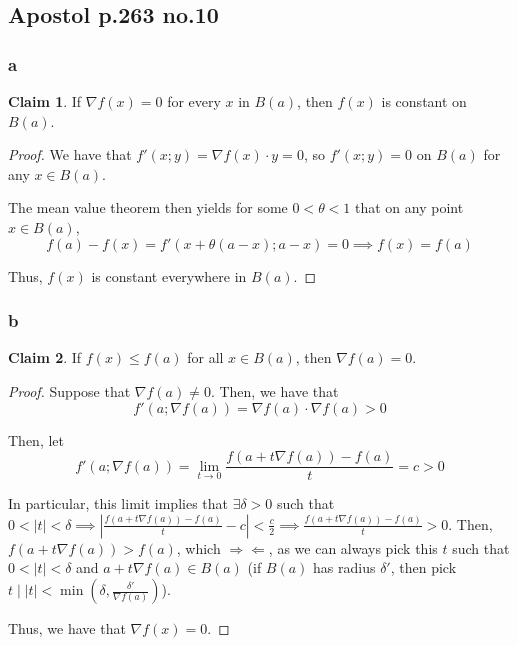 \documentclass[12pt,letterpaper]{article}
\theoremstyle{definition}
\newtheorem*{claim}{Claim}
\newcommand{\contra}{\Rightarrow\!\Leftarrow}
\begin{document}
\subsection*{Apostol p.263 no.10}

\subsubsection*{a}

\begin{claim}
  If $\nabla f(x) = 0$ for every $x$ in $B(a)$, then $f(x)$ is constant on $B(a)$.
\end{claim}

\begin{proof}
  We have that $f'(x;y) = \nabla f(x) \cdot y = 0$, so $f'(x;y) = 0$ on $B(a)$
  for any $x \in B(a)$.
  
  The mean value theorem then yields for some $0 < \theta < 1$ that on any point
  $x \in B(a)$,
  \[
    f(a) - f(x) = f'(x+\theta(a-x);a-x) = 0 \implies f(x) = f(a)
  \]

  Thus, $f(x)$ is constant everywhere in $B(a)$.
\end{proof}

\subsubsection*{b}

\begin{claim}
  If $f(x) \leq f(a)$ for all $x \in B(a)$, then $\nabla f(a) = 0$.
\end{claim}

\begin{proof}
  Suppose that $\nabla f(a) \neq 0$. Then, we have that
  \[
    f'(a; \nabla f(a)) = \nabla f(a) \cdot \nabla f(a) > 0
  \]

  Then, let 
  \[
    f'(a; \nabla f(a)) = \lim_{t\rightarrow 0}\frac{f(a + t\nabla f(a)) -
      f(a)}{t} = c > 0 
  \]

  In particular, this limit implies that $\exists \delta > 0$ such that $0 < |t|
  < \delta \implies |\frac{f(a + t\nabla f(a)) -
    f(a)}{t} - c| < \frac{c}{2} \implies \frac{f(a + t\nabla f(a)) -
    f(a)}{t} > 0$. Then, $f(a + t\nabla f(a)) > f(a)$, which $\contra$, as we
  can always pick this $t$ such that $0 < |t| < \delta$ and $a + t \nabla f(a) \in
  B(a)$ (if $B(a)$ has radius $\delta'$, then pick $t \mid |t| < \min(\delta,
  \frac{\delta'}{\nabla f(a)})$).
  

  Thus, we have that $\nabla f(x) = 0$.
\end{proof}
\end{document}
